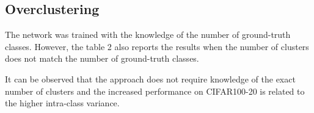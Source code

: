 \setlength{\tabcolsep}{4pt}
\begin{table}[ht]
\begin{center}
\caption{Validation set results for 50, 100 and 200 randomly selected classes from ImageNet.}
\label{table: imagenet_subsets}
\end{center}

\end{table}
\setlength{\tabcolsep}{1.4pt}
 

\subsection{Overclustering}  

The network was trained with the knowledge of the number of ground-truth classes. However, the table 2 also reports the results when the number of clusters does not match the number of ground-truth classes. 

It can be observed that the approach does not require knowledge of the exact number of clusters and the increased performance on CIFAR100-20 is related to the higher intra-class variance. 




